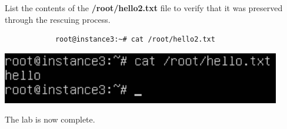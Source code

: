 \documentclass[letterpaper, 12pt]{article}
\begin{document}
\begin{enumerate}
    \begin{labstep}
        List the contents of the \textbf{/root/hello2.txt} file to verify that it was preserved through the rescuing process.
        \begin{lstlisting}
            root@instance3:~# cat /root/hello2.txt
        \end{lstlisting}

        \begin{center}
            \includegraphics[width=\linewidth]{images/part8/step18.png}
        \end{center}
    \end{labstep}

    \begin{labstep}
        The lab is now complete.
    \end{labstep}

\end{enumerate}
\end{document}
